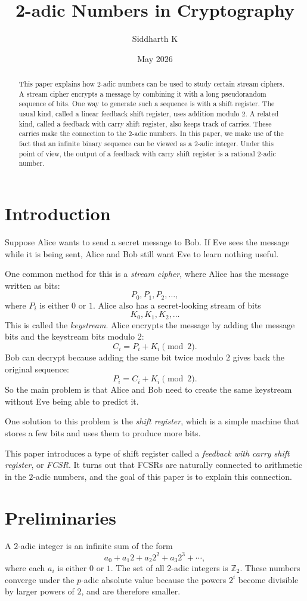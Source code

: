 \documentclass[12pt]{amsart}
\title{2-adic Numbers in Cryptography}
\author{Siddharth K}
\date{May 2026}
\theoremstyle{plain}
\theoremstyle{definition}
\theoremstyle{remark}
\newcommand{\Z}{\mathbb{Z}}
\begin{document}
\begin{abstract}
This paper explains how 2-adic numbers can be used to study certain stream ciphers. A stream cipher encrypts a message by combining it with a long pseudorandom sequence of bits. One way to generate such a sequence is with a shift register. The usual kind, called a linear feedback shift register, uses addition modulo 2. A related kind, called a feedback with carry shift register, also keeps track of carries. These carries make the connection to the 2-adic numbers. In this paper, we make use of the fact that an infinite binary sequence can be viewed as a 2-adic integer. Under this point of view, the output of a feedback with carry shift register is a rational 2-adic number.
\end{abstract}

\maketitle

\section{Introduction}
Suppose Alice wants to send a secret message to Bob. If Eve sees the message while it is being sent, Alice and Bob still want Eve to learn nothing useful.

One common method for this is a \emph{stream cipher}, where Alice has the message written as bits:
$$P_0, P_1, P_2, \ldots,$$
where $P_i$ is either $0$ or $1$. Alice also has a secret-looking stream of bits
$$K_0, K_1, K_2, \ldots$$
This is called the \emph{keystream}. Alice encrypts the message by adding the message bits and the keystream bits modulo $2$:
$$C_i = P_i + K_i \pmod{2}.$$
Bob can decrypt because adding the same bit twice modulo $2$ gives back the original sequence:
$$P_i = C_i + K_i \pmod{2}.$$
So the main problem is that Alice and Bob need to create the same keystream without Eve being able to predict it.

One solution to this problem is the \emph{shift register}, which is a simple machine that stores a few bits and uses them to produce more bits.

This paper introduces a type of shift register called a \emph{feedback with carry shift register}, or \emph{FCSR}. It turns out that FCSRs are naturally connected to arithmetic in the $2$-adic numbers, and the goal of this paper is to explain this connection.

\section{Preliminaries}
A $2$-adic integer is an infinite sum of the form
$$a_0 + a_1 2 + a_2  2^2 + a_3  2^3 + \cdots,$$
where each $a_i$ is either $0$ or $1$. The set of all $2$-adic integers is $\Z_2$. These numbers converge under the $p$-adic absolute value because the powers $2^i$ become divisible by larger powers of $2$, and are therefore smaller.
\end{document}
